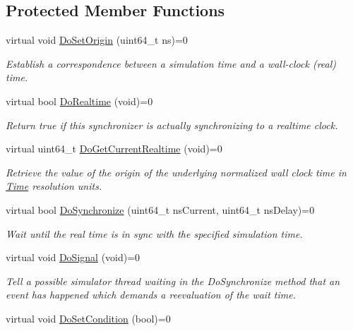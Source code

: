 \subsection*{Protected Member Functions}
\begin{DoxyCompactItemize}
\item 
virtual void \hyperlink{classns3_1_1Synchronizer_aee90af19ede115e7706db3861d53660d}{Do\+Set\+Origin} (uint64\+\_\+t ns)=0
\begin{DoxyCompactList}\small\item\em Establish a correspondence between a simulation time and a wall-\/clock (real) time. \end{DoxyCompactList}\item 
virtual bool \hyperlink{classns3_1_1Synchronizer_a328ba5b729875de0875d9a8839e3cfd4}{Do\+Realtime} (void)=0
\begin{DoxyCompactList}\small\item\em Return {\ttfamily true} if this synchronizer is actually synchronizing to a realtime clock. \end{DoxyCompactList}\item 
virtual uint64\+\_\+t \hyperlink{classns3_1_1Synchronizer_ac4f7965fa06c3131314a3aa1a1c0b37f}{Do\+Get\+Current\+Realtime} (void)=0
\begin{DoxyCompactList}\small\item\em Retrieve the value of the origin of the underlying normalized wall clock time in \hyperlink{classns3_1_1Time}{Time} resolution units. \end{DoxyCompactList}\item 
virtual bool \hyperlink{classns3_1_1Synchronizer_a62f413ac3bb8335ecfa79ba899673055}{Do\+Synchronize} (uint64\+\_\+t ns\+Current, uint64\+\_\+t ns\+Delay)=0
\begin{DoxyCompactList}\small\item\em Wait until the real time is in sync with the specified simulation time. \end{DoxyCompactList}\item 
virtual void \hyperlink{classns3_1_1Synchronizer_ac6043fc40824c6b290ef815fb11c1385}{Do\+Signal} (void)=0
\begin{DoxyCompactList}\small\item\em Tell a possible simulator thread waiting in the Do\+Synchronize method that an event has happened which demands a reevaluation of the wait time. \end{DoxyCompactList}\item 
virtual void \hyperlink{classns3_1_1Synchronizer_a46ef375cfe8313c47df564e6b8e933e5}{Do\+Set\+Condition} (bool)=0

\end{DoxyCompactItemize}
